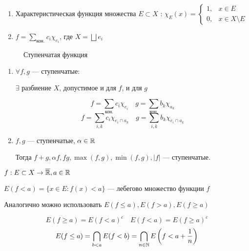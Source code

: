 \begin{example}\itemfix
    \begin{enumerate}
        \item Характеристическая функция множества \(E\subset X\) : \(\chi_E(x) = \begin{cases}
                  1, & x\in E            \\
                  0, & x\in X\setminus E
              \end{cases}\)
        \item \(f = \sum\limits_{\text{кон.}} c_i \chi_{e_i}\), где \(X = \bigsqcup e_i\)
    \end{enumerate}
\end{example}

\begin{figure}[h]
    \centering
    
    \caption{Ступенчатая функция}
\end{figure}

\begin{prop}\itemfix
    \begin{enumerate}
        \item \(\forall f, g\) --- ступенчатые:

              \(\exists \) разбиение \(X\), допустимое и для \(f\), и для \(g\)

              \[f = \sum\limits_{\text{кон.}} c_i \chi_{e_i} \quad g = \sum\limits_{\text{кон.}} b_k \chi_{a_k}\]
              \[f = \sum\limits_{i, k} c_i \chi_{e_i \cap a_k} \quad g = \sum\limits_{i, k} b_k \chi_{e_i \cap a_k}\]
        \item \(f, g\) --- ступенчатые, \(\alpha\in\mathbb{R}\)

              Тогда \(f + g, \alpha f, fg, \max(f, g), \min(f, g), |f|\) --- ступенчатые.
    \end{enumerate}
\end{prop}

\begin{definition}
    \(f : E\subset X \to \overline {\mathbb{R}}, a\in\mathbb{R}\)

    \(E(f < a) = \{x\in E : f(x) < a\} \) --- лебегово множество функции \(f\)

    Аналогично можно использовать \(E(f \leq a), E(f > a), E(f \geq a)\)
\end{definition}

\begin{remark}
    \[E(f \geq a) = E(f < a)^c \quad E(f < a) = E(f \geq a)^c\]
    \[E(f \leq a) = \bigcap_{b < a} E(f < b) = \bigcap_{n\in\mathbb{N}} E\left(f < a + \frac{1}{n}\right)\]
\end{remark}

